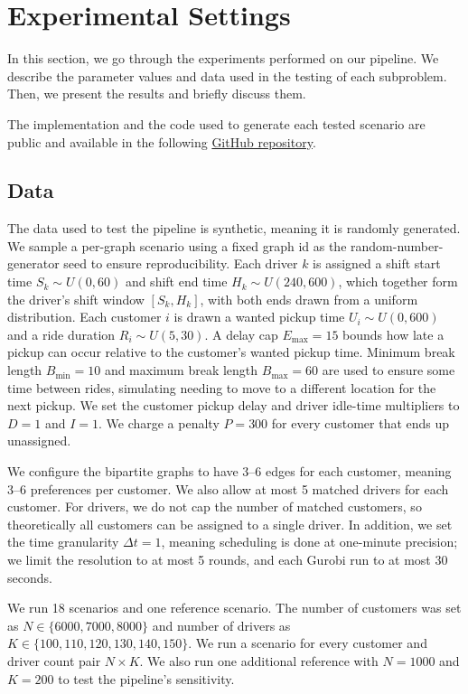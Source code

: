 \section{Experimental Settings}
\label{sec:experimental-settings}

In this section, we go through the experiments performed on our pipeline. We describe the parameter values and data used in the testing of each subproblem. Then, we present the results and briefly discuss them.

The implementation and the code used to generate each tested scenario are public and available in the following \href{https://github.com/aapolaakkio/thesis}{GitHub repository}.

\subsection{Data}

The data used to test the pipeline is synthetic, meaning it is randomly generated. We sample a per-graph scenario using a fixed graph id as the random-number-generator seed to ensure reproducibility. Each driver $k$ is assigned a shift start time $S_k\sim U(0, 60)$ and shift end time $H_k\sim U(240, 600)$, which together form the driver's shift window $[S_k, H_k]$, with both ends drawn from a uniform distribution. Each customer $i$ is drawn a wanted pickup time $U_i\sim U(0, 600)$ and a ride duration $R_i\sim U(5, 30)$. A delay cap $E_{\max}=15$ bounds how late a pickup can occur relative to the customer's wanted pickup time. Minimum break length $B_{\min}=10$ and maximum break length $B_{\max}=60$ are used to ensure some time between rides, simulating needing to move to a different location for the next pickup. We set the customer pickup delay and driver idle-time multipliers to $D=1$ and $I=1$. We charge a penalty $P=300$ for every customer that ends up unassigned.

We configure the bipartite graphs to have 3–6 edges for each customer, meaning 3–6 preferences per customer. We also allow at most 5 matched drivers for each customer. For drivers, we do not cap the number of matched customers, so theoretically all customers can be assigned to a single driver. In addition, we set the time granularity $\Delta t=1$, meaning scheduling is done at one-minute precision; we limit the resolution to at most 5 rounds, and each Gurobi run to at most 30 seconds.

We run 18 scenarios and one reference scenario. The number of customers was set as $N\in\{6000,7000,8000\}$ and number of drivers as $K\in\{100,110,120,130,140,150\}$. We run a scenario for every customer and driver count pair $N \times K$. We also run one additional reference with $N=1000$ and $K=200$ to test the pipeline's sensitivity.

